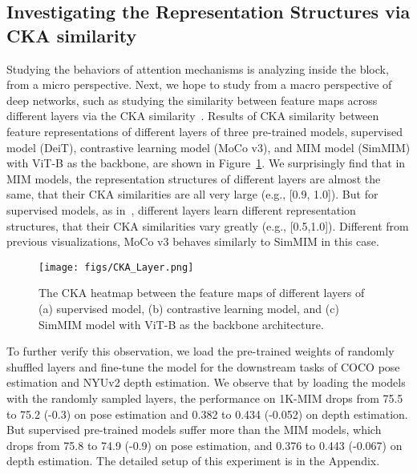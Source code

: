 \documentclass{article}
\begin{document}
\subsection{Investigating the Representation Structures via CKA similarity}
Studying the behaviors of attention mechanisms is analyzing inside the block, from a micro perspective. Next, we hope to study from a macro perspective of deep networks, such as studying the similarity between feature maps across different layers via the CKA similarity~\cite{cka}. Results of CKA similarity between feature representations of different layers of three pre-trained models, supervised model (DeiT), contrastive learning model (MoCo v3), and MIM model (SimMIM) with ViT-B as the backbone, are shown in Figure~\ref{fig:cka_layer}. We surprisingly find that in MIM models, the representation structures of different layers are almost the same, that their CKA similarities are all very large (e.g., [0.9, 1.0]). But for supervised models, as in~\cite{raghu2021vision}, different layers learn different representation structures, that their CKA similarities vary greatly (e.g., [0.5,1.0]). Different from previous visualizations, MoCo v3 behaves similarly to SimMIM in this case.

\label{subsubsection:similar-layers}

\begin{figure}
    \centering
    \texttt{[image: figs/CKA\_Layer.png]}
	    \vspace{-1.5em}
    \caption{The CKA heatmap between the feature maps of different layers of (a) supervised model, (b) contrastive learning model, and (c) SimMIM model with ViT-B as the backbone architecture.}
    \label{fig:cka_layer}
\end{figure}



To further verify this observation, we load the pre-trained weights of randomly shuffled layers and fine-tune the model for the downstream tasks of COCO pose estimation and NYUv2 depth estimation. 
We observe that by loading the models with the randomly sampled layers, the performance on 1K-MIM drops from 75.5 to 75.2 (-0.3) on pose estimation and 0.382 to 0.434 (-0.052) on depth estimation. But supervised pre-trained models suffer more than the MIM models, which drops from 75.8 to 74.9 (-0.9) on pose estimation, and 0.376 to 0.443 (-0.067) on depth estimation. 
The detailed setup of this experiment is in the Appendix.
\end{document}
